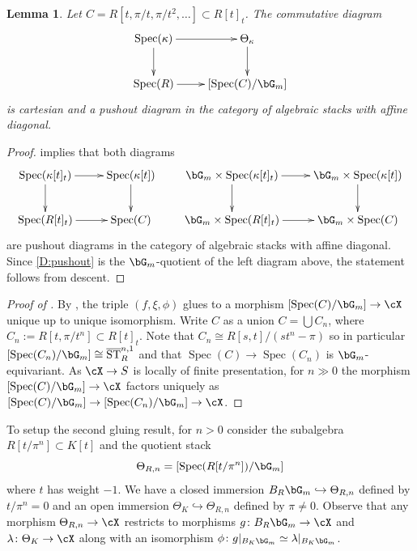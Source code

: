 \documentclass[a4paper]{amsart}
\numberwithin{equation}{section}
\theoremstyle{plain}
\newtheorem{lem}[thm]{Lemma}
\theoremstyle{definition}
\DeclareMathOperator{\Spec}{Spec}
\DeclareMathOperator{\ST}{ST}
\newcommand{\co}{\colon}
\def\oST{\overline{\ST}}
\begin{document}
\begin{lem} \label{L:pushout2}
Let $C = R[t,\pi/t,\pi/t^2,\ldots] \subset R[t]_t$. The commutative diagram
\begin{equation} \label{D:pushout}
\begin{split}
\xymatrix{
\Spec(\kappa) \ar[r] \ar[d]		& \Theta_{\kappa} \ar[d] \\
\Spec(R) \ar[r]			& [\Spec(C)/\bG_m]
}
\end{split}
\end{equation}
is cartesian and a pushout diagram in the category of algebraic stacks with affine diagonal.
\end{lem}

\begin{proof}
 implies that both diagrams
\begin{equation*}
\begin{split}
\xymatrix{
\Spec(\kappa[t]_t) \ar[r] \ar[d]		& \Spec(\kappa[t]) \ar[d] \\
\Spec(R[t]_t) \ar[r]			& \Spec(C) 
}
\qquad
\xymatrix{
\bG_m \times \Spec(\kappa[t]_t) \ar[r] \ar[d]		& \bG_m \times \Spec(\kappa[t]) \ar[d] \\
\bG_m \times \Spec(R[t]_t) \ar[r]			& \bG_m \times \Spec(C) 
}
\end{split}
\end{equation*}
are pushout diagrams in the category of algebraic stacks with affine diagonal.  Since \eqref{D:pushout} is the $\bG_m$-quotient of the left diagram above, the statement follows from descent.
\end{proof}


\begin{proof}[Proof of ]
By , the triple $(f, \xi, \phi)$ glues to a morphism $[\Spec(C) / \bG_m] \to \cX$ unique up to unique isomorphism. Write $C$ as a union $C = \bigcup C_n$, where $C_n := R[t,\pi/t^n] \subset R[t]_t$. Note that  $C_n \cong R[s,t]/(st^n - \pi)$ so in particular $[\Spec(C_n)/\bG_m] \cong \oST_R^{n,1}$ and that $\Spec(C) \to \Spec(C_n)$ is $\bG_m$-equivariant.  As $\cX \to S$ is locally of finite presentation, for $n \gg 0$ the morphism $[\Spec(C) / \bG_m] \to \cX$ factors uniquely as $[\Spec(C) / \bG_m] \to [\Spec(C_n) / \bG_m]  \to \cX$.
\end{proof}

To setup the second gluing result, for $n > 0$ consider the subalgebra $R[t/\pi^n] \subset K[t]$ and the quotient stack 
\[
\Theta_{R,n} = [\Spec(R[t/\pi^n]) / \bG_m]
\]
where $t$ has weight $-1$. We have a closed immersion $B_R \bG_m \hookrightarrow \Theta_{R,n}$ defined by $t/\pi^n=0$ and an open immersion $\Theta_K \hookrightarrow \Theta_{R,n}$ defined by $\pi \neq 0$.  Observe that any morphism  $\Theta_{R,n} \to \cX$ restricts to morphisms $g \co B_R \bG_m \to \cX$ and $\lambda \co \Theta_K \to \cX$ along with an isomorphism $\phi \co g|_{B_K \bG_m} \simeq \lambda|_{B_K \bG_m}$.  
\end{document}
